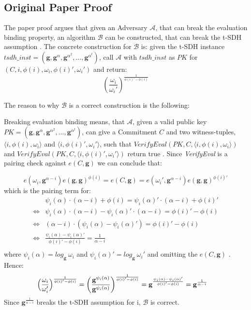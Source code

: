 \subsection*{Original Paper Proof}
\label{security:binding:paper}
The paper \parencite{KZG} proof argues that given an Adversary $\mathcal{A}$, that can break the evaluation binding property, an algorithm $\mathcal{B}$ can be constructed, that can break the t-SDH assumption \parencite{KZG}. The concrete construction for $\mathcal{B}$ is: given the t-SDH instance $tsdh\_inst =(\mathbf{g}, \mathbf{g}^{\alpha}, \mathbf{g}^{\alpha^2},\dots, \mathbf{g}^{\alpha^t})$, call $\mathcal{A}$ with $tsdh\_inst$ as $PK$ for $(C,i,\phi(i),\omega_i,\phi(i)',\omega_i')$ and return: 
$$(\frac{\omega_i}{\omega_i'})^{\frac{1}{\phi(i)'-\phi(i)}}$$

The reason to why $\mathcal{B}$ is a correct construction is the following: 

Breaking evaluation binding means, that $\mathcal{A}$, given a valid public key $PK=(\mathbf{g}, \mathbf{g}^{\alpha}, \mathbf{g}^{\alpha^2},\dots, \mathbf{g}^{\alpha^t})$, can give a Commitment $C$ and two witness-tuples, $\langle i, \phi(i),\omega_i\rangle$ and $\langle i, \phi(i)', \omega_i'\rangle$, such that $VerifyEval(PK, C,\langle i,\phi(i), \omega_i\rangle )$ and $VerifyEval(PK, C,\langle i,\phi(i)', \omega_i'\rangle )$ return true \parencite{KZG}. Since \textit{VerifyEval} is a pairing check against $e(C,\mathbf{g})$ we can conclude that: 

$$e(\omega_i,\mathbf{g}^{\alpha-i})e(\mathbf{g}, \mathbf{g})^{\phi(i)} = e(C,\mathbf{g}) = e(\omega_i',\mathbf{g}^{\alpha-i})e(\mathbf{g}, \mathbf{g})^{\phi(i)'}$$
which is the pairing term for: 
\begin{equation*}
    \begin{aligned}
        &\psi_i(\alpha) \cdot (\alpha-i) + \phi(i) = \psi_i(\alpha)' \cdot (\alpha-i) + \phi(i)' \\
        \iff&  \psi_i(\alpha) \cdot (\alpha-i) - \psi_i(\alpha)' \cdot (\alpha-i) = \phi(i)' - \phi(i)\\
        \iff& (\alpha-i)  \cdot (\psi_i(\alpha) - \psi_i(\alpha)') = \phi(i)' - \phi(i)\\
        \iff& \frac{\psi_i(\alpha) - \psi_i(\alpha)'}{\phi(i)' - \phi(i)} = \frac{1}{\alpha - i}\\
    \end{aligned}
\end{equation*}
where $\psi_i(\alpha)= log_{\mathbf{g}}\ \omega_i$ and $\psi_i(\alpha)'= log_{\mathbf{g}}\ \omega_i'$ and omitting the $e(C,\mathbf{g})$
\parencite{KZG}.
Hence: 
\begin{equation*}
    \begin{aligned}
        &\Bigl(\frac{\omega_i}{\omega_i'}\Bigr)^{\frac{1}{\phi(i)'-\phi(i)}} 
        = \biggl(\frac{\mathbf{g}^{\psi_i(\alpha)}}{\mathbf{g}^{\psi_i(\alpha)}}\biggr)^{\frac{1}{\phi(i)'-\phi(i)}}
        = \mathbf{g}^{\frac{\psi_i(\alpha) - \psi_i(\alpha)'}{\phi(i)' - \phi(i)}}
        = \mathbf{g}^{\frac{1}{\alpha-i}}
    \end{aligned}
\end{equation*}
Since $\mathbf{g}^{\frac{1}{\alpha-i}}$ breaks the t-SDH assumption for i, $\mathcal{B}$ is correct.

